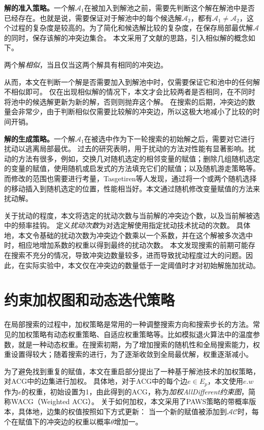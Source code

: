 \textbf{解的准入策略。}一个解$\mathcal{A_1}$在被加入到解池之前，需要先判断这个解在解池中是否已经存在。也就是说，需要保证对于解池中的每个候选解$\mathcal{A_2}$，都有$\mathcal{A_1} \neq \mathcal{A_2}$，这个过程的复杂度是较高的。为了简化和候选解比较的复杂度，在保存局部最优解$\mathcal{A}$的同时，保存该解的冲突边集合。
本文采用了文献\cite{pan2022fast}的思路，引入相似解的概念如下。
\begin{definition}
    两个解\textit{相似}，当且仅当这两个解具有相同的冲突边。
\end{definition}
从而，本文在判断一个解是否需要加入到解池中时，仅需要保证它和池中的任何解不相似即可。
仅在出现相似解的情况下，本文才会比较两者是否相同，在不同时将池中的候选解更新为新的解，否则则抛弃这个解。
在搜索的后期，冲突边的数量会非常少，由于判断相似仅需要比较解的冲突边，所以这极大地减小了比较的时间开销。

\textbf{解的生成策略。}一个解$\mathcal{A_1}$在被选中作为下一轮搜索的初始解之后，需要对它进行扰动以逃离局部最优。
过去的研究表明，用于扰动的方法对性能有显著影响。扰动的方法有很多，例如，交换几对随机选定的相邻变量的赋值；删除几组随机选定的变量的赋值，使用随机或启发式的方法填充它们的赋值；以及随机游走策略等。而修改的范围也需要进行考量，Tasgetiren等人\cite{tasgetiren2007particle}发现，通过将一个或两个随机选择的移动插入到随机选定的位置，性能相当好。本文通过随机修改变量赋值的方法来扰动解。

关于扰动的程度，本文将选定的扰动次数与当前解的冲突边个数，以及当前解被选中的频率挂钩。
定义\textit{扰动次数}为对选定解使用指定扰动技术扰动的次数。
具体地，本文令基础的扰动次数为冲突边个数乘以一个系数，并在这个解被多次选中时，相应地增加系数的权重以得到最终的扰动次数。
本文发现搜索的前期可能存在搜索不充分的情况，导致冲突边数量较多，进而导致扰动程度过大的问题。因此，在实际实验中，本文仅在冲突边的数量低于一定阈值时才对初始解施加扰动。

\section{约束加权图和动态迭代策略}

在局部搜索的过程中，加权策略是常用的一种调整搜索方向和搜索步长的方法。常见的加权策略有动态权重策略、自适应权重策略等。比如模拟退火算法中的温度参数，就是一种动态权重。在搜索初期，为了增加搜索的随机性和全局搜索能力，权重设置得较大；随着搜索的进行，为了逐渐收敛到全局最优解，权重逐渐减小。


为了避免找到重复的赋值，本文在重启部分提出了一种基于解池技术的加权策略，对ACG中的边集进行加权。
具体地，对于ACG中的每个边$e \in E_p$，本文使用$e.w$作为$e$的权重，初始设置为1，由此得到的ACG，称为\textit{加权AllDifferent约束图}，简称WACG（Weighted ACG）。
关于如何加权，本文采用了PAWS策略的带概率版本，具体地，边集的权值按照如下方式更新：
当一个新的赋值被添加到$\mathcal{AC}$时，每个在赋值下的冲突边的权重以概率$\theta$增加一。

